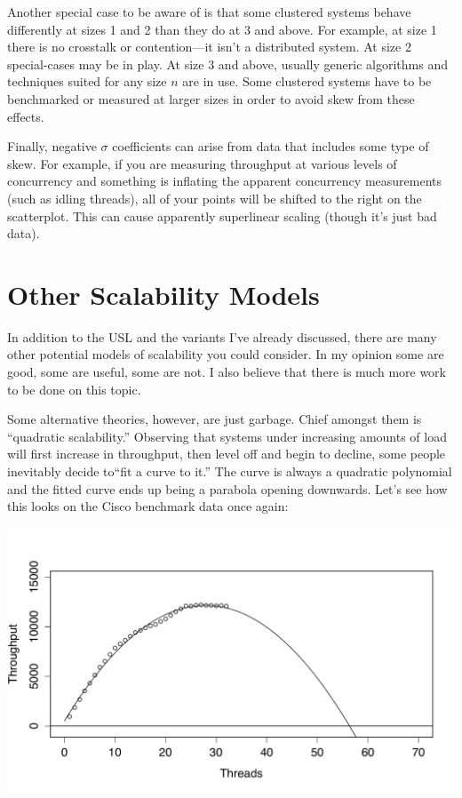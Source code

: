 \documentclass{vivid_layout}
\begin{document}
Another special case to be aware of is that some clustered systems behave
differently at sizes 1 and 2 than they do at 3 and above. For example, at size 1
there is no crosstalk or contention---it isn't a distributed system. At size 2
special-cases may be in play. At size 3 and above, usually generic algorithms
and techniques suited for any size $n$ are in use. Some clustered systems have
to be benchmarked or measured at larger sizes in order to avoid skew from these
effects.

Finally, negative $\sigma$ coefficients can arise from data that includes some
type of skew. For example, if you are measuring throughput at various levels of
concurrency and something is inflating the apparent concurrency measurements
(such as idling threads), all of your points will be shifted to the right on the
scatterplot. This can cause apparently superlinear scaling (though it's just bad
data).

\section{Other Scalability Models}

In addition to the USL and the variants I've already discussed, there are many
other potential models of scalability you could consider. In my opinion some are
good, some are useful, some are not. I also believe that there is much more work
to be done on this topic.

Some alternative theories, however, are just garbage. Chief amongst them is
``quadratic scalability.'' Observing that systems under increasing amounts of
load will first increase in throughput, then level off and begin to decline,
some people inevitably decide to``fit a curve to it.'' The curve
is always a quadratic polynomial and the fitted curve ends up being a parabola
opening downwards. Let's see how this looks on the Cisco benchmark data 
once again:
\begin{center}
\includegraphics[width=.85\linewidth]{scalability/quadratic}
\end{center}
\end{document}
